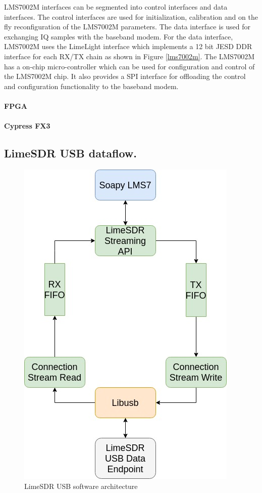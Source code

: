LMS7002M interfaces can be segmented into control interfaces and data interfaces.
The control interfaces are used for initialization, calibration and on the fly reconfiguration of the LMS7002M parameters.
The data interface is used for exchanging \ac{IQ} samples with the baseband modem.
For the data interface, LMS7002M uses the LimeLight interface which implements a 12 bit JESD \ac{DDR} interface for each RX/TX chain as shown in Figure \ref{lms7002m}.
The LMS7002M has a on-chip micro-controller which can be used for configuration and control of the LMS7002M chip.
It also provides a \ac{SPI} interface for offloading the control and configuration functionality to the baseband modem.


\paragraph{FPGA}
\paragraph{Cypress FX3}

\subsection{LimeSDR USB dataflow.}
\begin{figure}[h!]
\centering
\includegraphics[scale=0.6]{Figure/Software_Architecture.jpg}
\caption{LimeSDR USB software architecture}
\end{figure}

